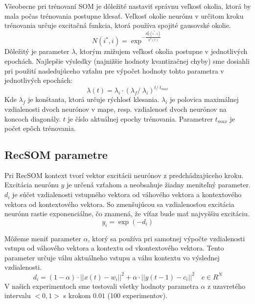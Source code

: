 Všeobecne pri trénovaní SOM je dôležité 
nastaviť správnu veľkosť okolia, ktorá by mala počas trénovania postupne klesať.
Veľkosť okolie neurónu v určitom kroku trénovania určuje excitačná funkcia, ktorá používa
spojité gausovské okolie.
\begin{equation}
    N(i^{*}, i) = \exp^{- \frac{d^{2}_{E}(i^{*}, i)}{\lambda^{2}(t)}}
\end{equation}
Dôležitý je parameter $\lambda$, ktorým znižujem veľkosť okolia postupne v jednotlivých epochách.
Najlepšie výsledky (najnižšie hodnoty kvantizačnej chyby) sme dosiahli pri použití nasledujúceho vzťahu pre výpočet hodnoty tohto parametra
v jednotlivých epochách:
\begin{equation}
    \lambda{(t)} = \lambda_{i} \cdot (\lambda_{f} /\ \lambda_{i})^{t /\ t_{max}}
\end{equation}
Kde $\lambda_{f}$ je konštanta, ktorá určuje rýchlosť klesania. 
$\lambda_{i}$ je polovica maximálnej vzdialenosti dvoch neurónov v mape, resp. 
vzdialenosť dvoch neurónov na koncoch diagonály.
$t$ je číslo aktuálnej epochy trénovania. Parametrer $t_{max}$ je počet 
epôch trénovania.


\subsection{RecSOM parametre}
Pri RecSOM kontext tvorí vektor excitácii neurónov z predchádzajúceho kroku.
Excitácia neurónu $y$ je určená vzťahom a neobsahuje žiadny meniteľný parameter. 
$d_{i}$ je súčet vzdialenosti vstupného vektora od váhového vektora a kontextového vektora od 
kontextového vektora. So zmenšujúcou sa vzdialenosťou excitácia neurónu rastie exponenciálne, čo 
znamená, že víťaz bude mať najvyššiu excitáciu.
\begin{equation}
    y_{i} = \exp{(-d_{i})}
\end{equation}

Môžeme meniť parameter $\alpha$, ktorý sa používa pri samotnej výpočte vzdialenosti
vstupu od váhového vektora a kontextu od vkontextového vektora. Tento parameter určuje váhu aktuálneho vstupu a váhu kontextu
vo výslednej vzdialenosti.
\begin{equation}
	d_i = (1 - \alpha) \cdot ||x(t) - w_i||^{2} + \alpha \cdot ||y(t-1) - c_i||^{2} \quad c \in R^{N}
\end{equation}
V našich experimentoch sme testovali všetky hodnoty parametra $\alpha$ z uzavretého intervalu
$<0, 1>$ s krokom $0.01$ (100 experimentov).

